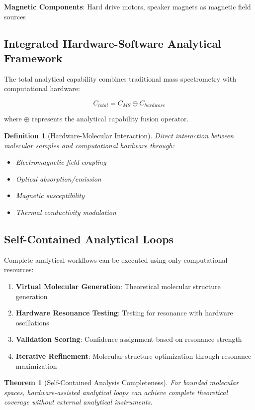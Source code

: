 \documentclass[11pt,a4paper]{article}
\newtheorem{theorem}{Theorem}
\newtheorem{definition}{Definition}
\begin{document}
\textbf{Magnetic Components}: Hard drive motors, speaker magnets as magnetic field sources

\subsection{Integrated Hardware-Software Analytical Framework}

The total analytical capability combines traditional mass spectrometry with computational hardware:

\begin{equation}
C_{total} = C_{MS} \oplus C_{hardware}
\end{equation}

where $\oplus$ represents the analytical capability fusion operator.

\begin{definition}[Hardware-Molecular Interaction]
Direct interaction between molecular samples and computational hardware through:
\begin{itemize}
\item Electromagnetic field coupling
\item Optical absorption/emission
\item Magnetic susceptibility
\item Thermal conductivity modulation
\end{itemize}
\end{definition}

\subsection{Self-Contained Analytical Loops}

Complete analytical workflows can be executed using only computational resources:

\begin{enumerate}
\item \textbf{Virtual Molecular Generation}: Theoretical molecular structure generation
\item \textbf{Hardware Resonance Testing}: Testing for resonance with hardware oscillations
\item \textbf{Validation Scoring}: Confidence assignment based on resonance strength
\item \textbf{Iterative Refinement}: Molecular structure optimization through resonance maximization
\end{enumerate}

\begin{theorem}[Self-Contained Analysis Completeness]
For bounded molecular spaces, hardware-assisted analytical loops can achieve complete theoretical coverage without external analytical instruments.
\end{theorem}
\end{document}

